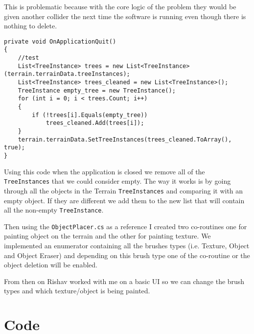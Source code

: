 This is problematic because with the core logic of the problem they would be given another collider the next time the software is running even though there is nothing to delete.

\begin{verbatim}
private void OnApplicationQuit()
{
    //test
    List<TreeInstance> trees = new List<TreeInstance>(terrain.terrainData.treeInstances);
    List<TreeInstance> trees_cleaned = new List<TreeInstance>();
    TreeInstance empty_tree = new TreeInstance();
    for (int i = 0; i < trees.Count; i++)
    {
        if (!trees[i].Equals(empty_tree))
            trees_cleaned.Add(trees[i]);
    }
    terrain.terrainData.SetTreeInstances(trees_cleaned.ToArray(), true);
}
\end{verbatim}

Using this code when the application is closed we remove all of the \texttt{TreeInstances} that we could consider empty. The way it works is by going through all the objects in the Terrain \texttt{TreeInstances}  and comparing it with an empty object. If they are different we add them to the new list that will contain all the non-empty \texttt{TreeInstance}.

Then using the \texttt{ObjectPlacer.cs} as a reference I created two co-routines one for painting object on the terrain and the other for painting texture. We implemented an enumerator containing all the brushes types (i.e. Texture, Object and Object Eraser) and depending on this brush type one of the co-routine or the object deletion will be enabled.

From then on Rishav worked with me on a basic UI so we can change the brush types and which texture/object is being painted.

\section{Code} \label{sec:appendix-b}
